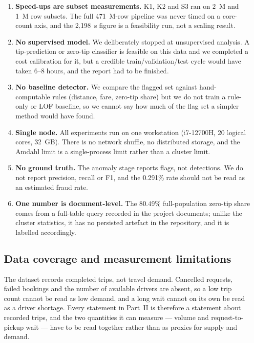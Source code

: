 \documentclass[11pt,a4paper]{article}
\begin{document}
\begin{enumerate}
\item \textbf{Speed-ups are subset measurements.} K1, K2 and S3 ran on 2~M and 1~M row subsets. The full 471~M-row pipeline was never timed on a core-count axis, and the 2{,}198~s figure is a feasibility run, not a scaling result.
\item \textbf{No supervised model.} We deliberately stopped at unsupervised analysis. A tip-prediction or zero-tip classifier is feasible on this data and we completed a cost calibration for it, but a credible train/validation/test cycle would have taken 6--8 hours, and the report had to be finished.
\item \textbf{No baseline detector.} We compare the flagged set against hand-computable rules (distance, fare, zero-tip share) but we do not train a rule-only or LOF baseline, so we cannot say how much of the flag set a simpler method would have found.
\item \textbf{Single node.} All experiments run on one workstation (i7-12700H, 20 logical cores, 32~GB). There is no network shuffle, no distributed storage, and the Amdahl limit is a single-process limit rather than a cluster limit.
\item \textbf{No ground truth.} The anomaly stage reports flags, not detections. We do not report precision, recall or F1, and the 0.291\% rate should not be read as an estimated fraud rate.
\item \textbf{One number is document-level.} The 80.49\% full-population zero-tip share comes from a full-table query recorded in the project documents; unlike the cluster statistics, it has no persisted artefact in the repository, and it is labelled accordingly.
\end{enumerate}

\subsection{Data coverage and measurement limitations}

The dataset records completed trips, not travel demand. Cancelled requests, failed
bookings and the number of available drivers are absent, so a low trip count cannot be
read as low demand, and a long wait cannot on its own be read as a driver shortage.
Every statement in Part~II is therefore a statement about recorded trips, and the two
quantities it can measure --- volume and request-to-pickup wait --- have to be read
together rather than as proxies for supply and demand.
\end{document}
